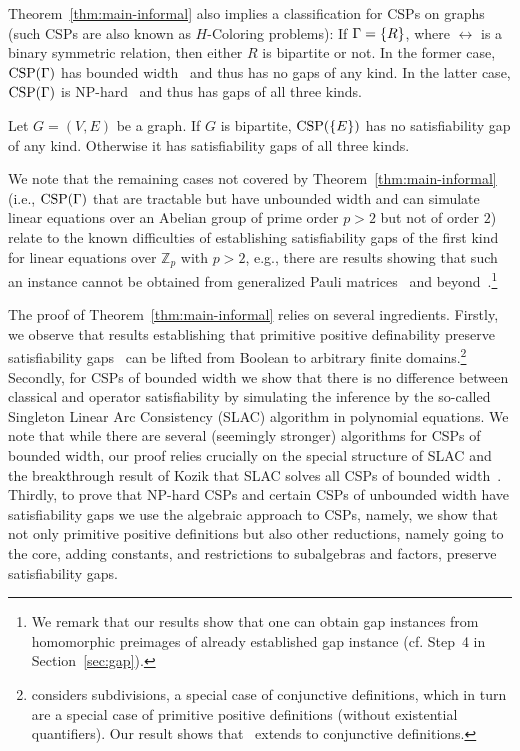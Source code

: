 \documentclass[11pt,letter]{article}
\begin{document}
Theorem~\ref{thm:main-informal} also implies
a classification for CSPs on graphs (such CSPs are also known as $H$-Coloring problems): If $\Gamma=\{R\}$, where $\rel$ is a binary
symmetric relation, then either $R$ is bipartite or not. In the former case,
${\rm CSP}(\Gamma)$ has bounded width~\cite{Bulatov18:survey} and thus has no gaps of any kind. In the latter
case, ${\rm CSP}(\Gamma)$ is NP-hard~\cite{HellN90,Bulatov05:tcs} and thus has gaps of
all three kinds.

\begin{corollary}\label{cor:graphs}
Let $G=(V,E)$ be a graph. If $G$ is bipartite, ${\rm CSP}(\{E\})$ has no satisfiability gap of any kind. Otherwise it has satisfiability gaps of all three kinds.
\end{corollary}

We note that the remaining cases not covered by Theorem~\ref{thm:main-informal}
(i.e., ${\rm CSP}(\Gamma)$ that are tractable but have unbounded width and can simulate
linear equations over an Abelian group of prime order $p>2$ but not of order
$2$) relate to the known difficulties of establishing satisfiability gaps of the
first kind for linear equations over $\mathbb{Z}_p$ with $p>2$, e.g., there are
results showing that such an instance cannot be obtained from generalized Pauli
matrices~\cite{Qassim20:jpa} and beyond~\cite{Frembs22:arxiv}.\footnote{We
remark that our results show that one can obtain gap instances from homomorphic
preimages of already established gap instance (cf. Step~4 in
Section~\ref{sec:gap}).}

\medskip
The proof of Theorem~\ref{thm:main-informal} relies on several ingredients. Firstly, we observe that
results establishing that primitive positive definability preserve
satisfiability gaps~\cite{AKS19:jcss} can be lifted from Boolean to arbitrary finite
domains.\footnote{\cite[Theorem~6.4]{Mastel24:stoc} considers subdivisions, a
special case of conjunctive definitions, which in turn are a special case of
primitive positive definitions (without existential quantifiers). Our result
shows that~\cite[Theorem~6.4]{Mastel24:stoc} extends to conjunctive
definitions.}
Secondly, for CSPs of bounded width we show that there is no difference
between classical and operator satisfiability by simulating the inference by the
so-called Singleton Linear Arc Consistency (SLAC) algorithm in polynomial
equations. We note that while there are several (seemingly stronger) algorithms
for CSPs of bounded width, our proof relies crucially on the special structure of SLAC and
the breakthrough result of Kozik that SLAC solves all CSPs of bounded
width~\cite{Kozik21:sicomp}. Thirdly, to prove that NP-hard CSPs and certain CSPs of unbounded width have
satisfiability gaps we use the algebraic approach to CSPs, namely, we show that not
only primitive positive definitions but also other reductions,
namely going to the core, adding constants, and restrictions to subalgebras and
factors, preserve satisfiability gaps.
\end{document}
